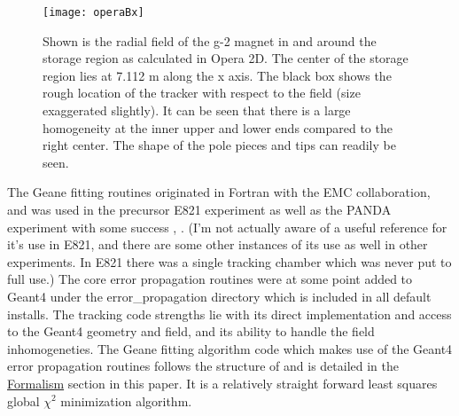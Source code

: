 \begin{figure}[]
\caption{Shown is the radial field of the g-2 magnet in and around the storage region as calculated in Opera 2D. The center of the storage region lies at 7.112 m along the x axis. The black box shows the rough location of the tracker with respect to the field (size exaggerated slightly). It can be seen that there is a large homogeneity at the inner upper and lower ends compared to the right center. The shape of the pole pieces and tips can readily be seen.}
\centering
\texttt{[image: operaBx]}
\label{fig:operaBx}
\end{figure}

  The Geane fitting routines originated in Fortran with the EMC collaboration, and was used in the precursor E821 experiment as well as the PANDA experiment with some success \cite{geanemanual}, \cite{Lavezzi}. (I'm not actually aware of a useful reference for it's use in E821, and there are some other instances of its use as well in other experiments. In E821 there was a single tracking chamber which was never put to full use.) The core error propagation routines were at some point added to Geant4 under the error\_propagation directory which is included in all default installs. The tracking code strengths lie with its direct implementation and access to the Geant4 geometry and field, and its ability to handle the field inhomogeneties. The Geane fitting algorithm code which makes use of the Geant4 error propagation routines follows the structure of \cite{geanemanual} and is detailed in the \hyperref[sec:Formalism]{Formalism} section in this paper. It is a relatively straight forward least squares global $\chi^{2}$ minimization algorithm. 

